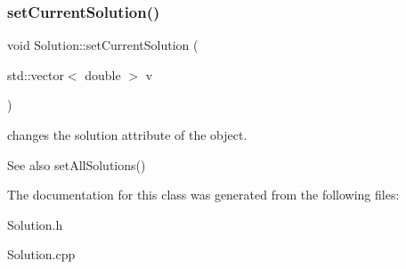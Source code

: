\subsubsection{\texorpdfstring{set\+Current\+Solution()}{setCurrentSolution()}}
{\footnotesize\ttfamily void Solution\+::set\+Current\+Solution (\begin{DoxyParamCaption}\item[{std\+::vector$<$ double $>$}]{v }\end{DoxyParamCaption})}

changes the solution attribute of the object. \begin{DoxySeeAlso}{See also}
set\+All\+Solutions() 
\end{DoxySeeAlso}


The documentation for this class was generated from the following files\+:\begin{DoxyCompactItemize}
\item 
Solution.\+h\item 
Solution.\+cpp\end{DoxyCompactItemize}
